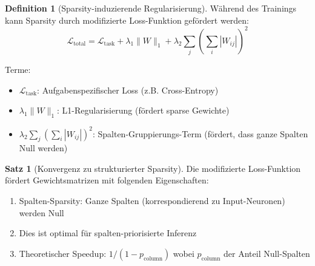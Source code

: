 ﻿\documentclass[a4paper,12pt]{report}
\theoremstyle{definition}
\newtheorem{definition}{Definition}
\newtheorem{satz}{Satz}
\begin{document}
	\begin{definition}[Sparsity-induzierende Regularisierung]
		Während des Trainings kann Sparsity durch modifizierte Loss-Funktion gefördert werden:
		\[
		\mathcal{L}_{\text{total}} = \mathcal{L}_{\text{task}} + \lambda_1 \|W\|_1 + \lambda_2 \sum_{j} \left(\sum_i |W_{ij}|\right)^2
		\]
		
		Terme:
		\begin{itemize}
			\item $\mathcal{L}_{\text{task}}$: Aufgabenspezifischer Loss (z.B. Cross-Entropy)
			\item $\lambda_1 \|W\|_1$: L1-Regularisierung (fördert sparse Gewichte)
			\item $\lambda_2 \sum_{j} (\sum_i |W_{ij}|)^2$: Spalten-Gruppierungs-Term (fördert, dass ganze Spalten Null werden)
		\end{itemize}
	\end{definition}
	
	\begin{satz}[Konvergenz zu strukturierter Sparsity]
		Die modifizierte Loss-Funktion fördert Gewichtsmatrizen mit folgenden Eigenschaften:
		\begin{enumerate}
			\item Spalten-Sparsity: Ganze Spalten (korrespondierend zu Input-Neuronen) werden Null
			\item Dies ist optimal für spalten-priorisierte Inferenz
			\item Theoretischer Speedup: $1 / (1 - p_{\text{column}})$ wobei $p_{\text{column}}$ der Anteil Null-Spalten
		\end{enumerate}
	\end{satz}
	
\end{document}
